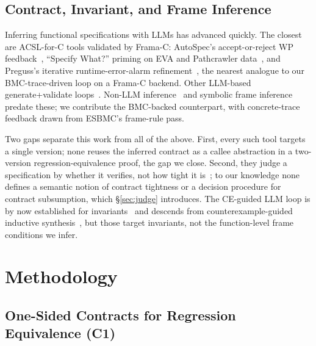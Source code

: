 \documentclass[conference]{IEEEtran}
\theoremstyle{definition}
\theoremstyle{remark}
\begin{document}
\subsection{Contract, Invariant, and Frame Inference}

Inferring functional specifications with LLMs has advanced quickly. The
closest are ACSL-for-C tools validated by Frama-C: AutoSpec's
accept-or-reject WP feedback~\cite{wen2024autospec}, ``Specify What?''
priming on EVA and Pathcrawler data~\cite{granberry2024specifywhat}, and
Preguss's iterative runtime-error-alarm refinement~\cite{wang2025preguss},
the nearest analogue to our BMC-trace-driven loop on a Frama-C backend.
Other LLM-based generate+validate
loops~\cite{tihanyi2023esbmcai,richter2025beyondpost,pirzada2026converusingcontractsloop}.
Non-LLM inference~\cite{amilon2025autodeduct,amilon2024mindreading} and
symbolic frame
inference~\cite{rakamaric2008frames,calcagno2009biabduction,quiver2024}
predate these; we contribute the BMC-backed counterpart, with concrete-trace
feedback drawn from ESBMC's frame-rule pass.

Two gaps separate this work from all of the above. First, every such
tool targets a single version; none reuses the inferred contract as a
callee abstraction in a two-version regression-equivalence proof, the
gap we close. Second, they judge a specification by whether it
verifies, not how tight it
is~\cite{granberry2024specifywhat,beg2026acsleval}; to our knowledge
none defines a semantic notion of contract tightness or a decision
procedure for contract subsumption, which \S\ref{sec:judge}
introduces. The CE-guided LLM loop is by now established for
invariants~\cite{lam4inv2024,clause2inv2025,bali2025,su2026cill,dafnypro2026,dafnyannotator2024,daisy2025,wei2025quokka}
and descends from counterexample-guided inductive
synthesis~\cite{sketch2008,garg2016icedt,padhi2016pie,si2018code2inv},
but those target invariants, not the function-level frame conditions we infer.

\section{Methodology}\label{sec:methodology}

\subsection{One-Sided Contracts for Regression Equivalence (C1)}
\end{document}
